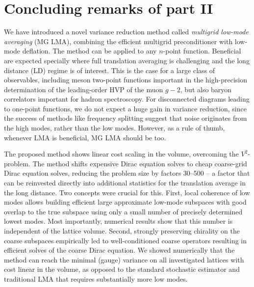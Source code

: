 \chapter{Concluding remarks of part II}
\label{ch:p2:conclusions}



We have introduced a novel variance reduction method called \emph{multigrid low-mode averaging} (MG LMA), combining the efficient multigrid preconditioner with low-mode deflation.
The method can be applied to any $n$-point function.
Beneficial are expected specially where full translation averaging is challenging and the long distance (LD) regime is of interest.
This is the case for a large class of observables, including meson two-point functions important in the high-precision determination of the leading-order HVP of the muon $g-2$, but also baryon correlators important for hadron spectroscopy.
For disconnected diagrams leading to one-point functions, we do not expect a huge gain in variance reduction, since the success of methods like frequency splitting suggest that noise originates from the high modes, rather than the low modes.
However, as a rule of thumb, whenever LMA is beneficial, MG LMA should be too.

The proposed method shows linear cost scaling in the volume, overcoming the $V^{2}$-problem.
The method shifts expensive Dirac equation solves to cheap coarse-grid Dirac equation solves, reducing the problem size by factors \numrange{30}{500} -- a factor that can be reinvested directly into additional statistics for the translation average in the long distance.
Two concepts were crucial for this.
First, local coherence of low modes allows building efficient large approximate low-mode subspaces with good overlap to the true subspace using only a small number of precisely determined lowest modes.
Most importantly, numerical results show that this number is independent of the lattice volume.
Second, strongly preserving chirality on the coarse subspaces empirically led to well-conditioned coarse operators resulting in efficient solves of the coarse Dirac equation.
We showed numerically that the method can reach the minimal (gauge) variance on all investigated lattices with cost linear in the volume, as opposed to the standard stochastic estimator and traditional LMA that requires substantially more low modes.

